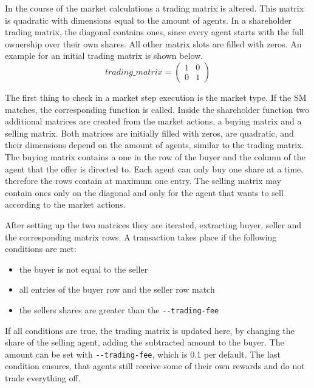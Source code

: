 In the course of the market calculations a trading matrix is altered. This matrix is quadratic with dimensions equal to the amount of agents. In a shareholder trading matrix, the diagonal contains ones, since every agent starts with the full ownership over their own shares. All other matrix slots are filled with zeros. An example for an initial trading matrix is shown below.
\begin{equation*}
trading\_matrix = 
\begin{pmatrix}
1 & 0 \\
0 & 1
\end{pmatrix}
\end{equation*}

The first thing to check in a market step execution is the market type. If the SM matches, the corresponding function is called. 
Inside the shareholder function two additional matrices are created from the market actions, a buying matrix and a selling matrix. Both matrices are initially filled with zeros, are quadratic, and their dimensions depend on the amount of agents, similar to the trading matrix. The buying matrix contains a one in the row of the buyer and the column of the agent that the offer is directed to.
Each agent can only buy one share at a time, therefore the rows contain at maximum one entry. The selling matrix may contain ones only on the diagonal and only for the agent that wants to sell according to the market actions.

After setting up the two matrices they are iterated, extracting buyer, seller and the corresponding matrix rows. A transaction takes place if the following conditions are met:
\begin{itemize}
    \item the buyer is not equal to the seller
    \item all entries of the buyer row and the seller row match
    \item the sellers shares are greater than the \verb|--trading-fee|
\end{itemize}

If all conditions are true, the trading matrix is updated here, by changing the share of the selling agent, adding the subtracted amount to the buyer. The amount can be set with \verb|--trading-fee|, which is 0.1 per default. The last condition ensures, that agents still receive some of their own rewards and do not trade everything off. 

